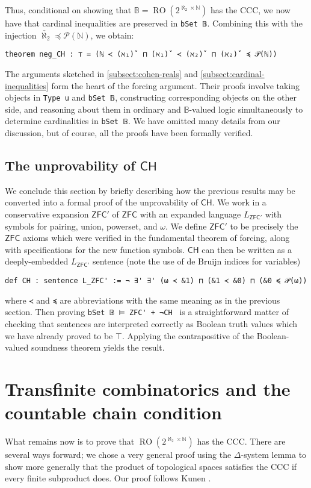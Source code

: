 \documentclass[a4paper,USenglish,cleveref, autoref]{lipics-v2019}
\newcommand{\B}{\mathbb{B}}
\newcommand{\lil}{\lstinline}
\theoremstyle{theorem}
\theoremstyle{definition}
\begin{document}
Thus, conditional on showing that $\B = \operatorname{RO}(2^{\aleph_2 \times \mathbb{N}})$ has the CCC, we now have that cardinal inequalities are preserved in \lstinline{bSet 𝔹}. Combining this with the injection $\check{\aleph_2} \preceq \mathcal{P}(\mathbb{N})$, we obtain:
\begin{lstlisting}
theorem neg_CH : ⊤ = (ℕ ≺ (ℵ₁)̌  ⊓ (ℵ₁)̌  ≺ (ℵ₂)̌  ⊓ (ℵ₂)̌  ≼ 𝒫(ℕ))
\end{lstlisting}

The arguments sketched in \autoref{subsect:cohen-reals} and \autoref{subsect:cardinal-inequalities} form the heart of the forcing argument. Their proofs involve taking objects in \lil{Type u} and \lil{bSet 𝔹}, constructing corresponding objects on the other side, and reasoning about them in ordinary and $\B$-valued logic simultaneously to determine cardinalities in \lstinline{bSet 𝔹}. We have omitted many details from our discussion, but of course, all the proofs have been formally verified.

\subsection{The unprovability of $\mathsf{CH}$} \label{subsect:unprovability}
We conclude this section by briefly describing how the previous results may be converted into a formal proof of the unprovability of $\mathsf{CH}$. We work in a conservative expansion $\mathsf{ZFC}'$ of $\mathsf{ZFC}$ with an expanded language $L_{\mathsf{ZFC}'}$ with symbols for pairing, union, powerset, and $\omega$. We define $\mathsf{ZFC}'$ to be precisely the $\mathsf{ZFC}$ axioms which were verified in the fundamental theorem of forcing, along with specifications for the new function symbols. $\mathsf{CH}$ can then be written as a deeply-embedded $L_{\mathsf{ZFC}'}$ sentence (note the use of de Bruijn indices for variables)
\begin{lstlisting}
def CH : sentence L_ZFC' := ¬ ∃' ∃' (ω ≺ &1) ⊓ (&1 ≺ &0) ⊓ (&0 ≼ 𝒫(ω))
\end{lstlisting}
where \lil{≺} and \lil{≼} are abbreviations with the same meaning as in the previous section. Then proving \lstinline{bSet 𝔹 ⊨ ZFC' + ¬CH } is a straightforward matter of checking that sentences are interpreted correctly as Boolean truth values which we have already proved to be $\top$. Applying the contrapositive of the Boolean-valued soundness theorem yields the result.

\section{Transfinite combinatorics and the countable chain condition}
\label{sect:ccc}
What remains now is to prove that $\operatorname{RO}(2^{\aleph_2 \times \mathbb{N}})$ has the CCC. There are several ways forward; we chose a very general proof using the
$\Delta$-system lemma to show more generally that the product of topological spaces satisfies the CCC if every finite subproduct does. Our proof follows Kunen \cite{kunen2014set}.
\end{document}
